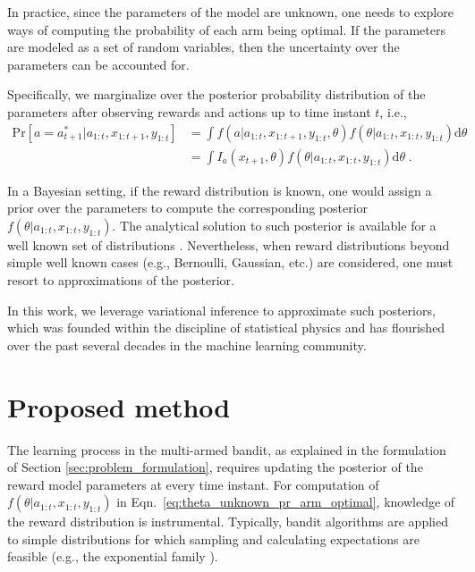\documentclass{article}
\newcommand{\ie}{i.e., }
\newcommand{\eg}{e.g., }
\begin{document}
In practice, since the parameters of the model are unknown, one needs to explore ways of computing the probability of each arm being optimal. If the parameters are modeled as a set of random variables, then the uncertainty over the parameters can be accounted for.

Specifically, we marginalize over the posterior probability distribution of the parameters after observing rewards and actions up to time instant $t$, \ie
\begin{equation}
\begin{split}
\mathrm{Pr}\left[a=a_{t+1}^* \big| a_{1:t}, x_{1:t+1}, y_{1:t}\right] & = \int f(a|a_{1:t}, x_{1:t+1}, y_{1:t}, \theta) f(\theta|a_{1:t}, x_{1:t}, y_{1:t}) \mathrm{d}\theta \\
	& =\int I_a(x_{t+1}, \theta) f(\theta|a_{1:t}, x_{1:t}, y_{1:t}) \mathrm{d}\theta \; .
\end{split}
\label{eq:theta_unknown_pr_arm_optimal}
\end{equation}

In a Bayesian setting, if the reward distribution is known, one would assign a prior over the parameters to compute the corresponding posterior $f(\theta|a_{1:t}, x_{1:t}, y_{1:t})$. The analytical solution to such posterior is available for a well known set of distributions \cite{b-Bernardo2009}. Nevertheless, when reward distributions beyond simple well known cases (\eg Bernoulli, Gaussian, etc.) are considered, one must resort to approximations of the posterior.

In this work, we leverage variational inference to approximate such posteriors, which was founded within the discipline of statistical physics and has flourished over the past several decades in the machine learning community. 

\section{Proposed method}
\label{sec:proposed_method}

The learning process in the multi-armed bandit, as explained in the formulation of Section \ref{sec:problem_formulation}, requires updating the posterior of the reward model parameters at every time instant. For computation of $f(\theta|a_{1:t}, x_{1:t}, y_{1:t})$ in Eqn.~\eqref{eq:theta_unknown_pr_arm_optimal}, knowledge of the reward distribution is instrumental. Typically, bandit algorithms are applied to simple distributions for which sampling and calculating expectations are feasible (\eg the exponential family \cite{ic-Korda2013}).
\end{document}
